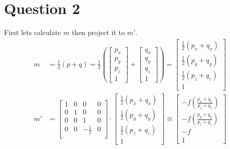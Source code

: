 \documentclass{article} %
\begin{document}
\section{Question 2}
First lets calculate $m$ then project it to $m'$.
\begin{align*}
m &= \frac{1}{2} \left(p+q\right)=\frac{1}{2}\left(
\begin{bmatrix}
p_x\\
p_y\\
p_z\\
1
\end{bmatrix}
+
\begin{bmatrix}
q_x\\
q_y\\
q_z\\
1
\end{bmatrix}
\right)
= \begin{bmatrix}
\frac{1}{2}(p_x + q_x)\\
\frac{1}{2}(p_y + q_y)\\
\frac{1}{2}(p_z + q_z)\\
1
\end{bmatrix}\\
m' &=
\begin{bmatrix}
1 & 0 & 0 & 0\\
0 & 1 & 0 & 0\\
0 & 0 & 1 & 0\\
0 & 0 & -\frac{1}{f} & 0\\
\end{bmatrix}
\cdot
\begin{bmatrix}
\frac{1}{2}(p_x + q_x)\\
\frac{1}{2}(p_y + q_y)\\
\frac{1}{2}(p_z + q_z)\\
1
\end{bmatrix}
\cong \begin{bmatrix}
-f\left(\frac{p_x + q_x}{p_z + q_z}\right)\\
-f\left(\frac{p_y + q_y}{p_z + q_z}\right)\\
-f\\
1
\end{bmatrix}
\end{align*}
\end{document}
